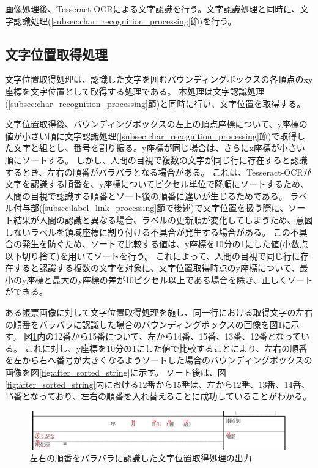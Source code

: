 画像処理後、Tesseract-OCRによる文字認識を行う。文字認識処理と同時に、文字認識処理(\ref{subsec:char_recognition_processing}節)を行う。


\subsection{文字位置取得処理}\label{subsec:char_position_obtainment_processing}
文字位置取得処理は、認識した文字を囲むバウンディングボックスの各頂点のxy座標を文字位置として取得する処理である。
本処理は文字認識処理(\ref{subsec:char_recognition_processing}節)と同時に行い、文字位置を取得する。

文字位置取得後、バウンディングボックスの左上の頂点座標について、y座標の値が小さい順に文字認識処理(\ref{subsec:char_recognition_processing}節)で取得した文字と組とし、番号を割り振る。y座標が同じ場合は、さらにx座標が小さい順にソートする。
しかし、人間の目視で複数の文字が同じ行に存在すると認識するとき、左右の順番がバラバラとなる場合がある。
これは、Tesseract-OCRが文字を認識する順番を、y座標についてピクセル単位で降順にソートするため、人間の目視で認識する順番とソート後の順番に違いが生じるためである。
ラベル付与部(\ref{subsec:label_link_processing}節で後述)で文字位置を扱う際に、ソート結果が人間の認識と異なる場合、ラベルの更新順が変化してしまうため、意図しないラベルを領域座標に割り付ける不具合が発生する場合がある。
この不具合の発生を防ぐため、ソートで比較する値は、y座標を10分の1にした値(小数点以下切り捨て)を用いてソートを行う。
これによって、人間の目視で同じ行に存在すると認識する複数の文字を対象に、文字位置取得時点のy座標について、最小のy座標と最大のy座標の差が10ピクセル以上である場合を除き、正しくソートができる。

ある帳票画像に対して文字位置取得処理を施し、同一行における取得文字の左右の順番をバラバラに認識した場合のバウンディングボックスの画像を図\ref{fig:before_sorted_string}に示す。
図\ref{fig:before_sorted_string}内の12番から15番について、左から14番、15番、13番、12番となっている。
これに対し、y座標を10分の1にした値で比較することにより、左右の順番を左から右へ番号が大きくなるようソートした場合のバウンディングボックスの画像を図\ref{fig:after_sorted_string}に示す。
ソート後は、図\ref{fig:after_sorted_string}内における12番から15番は、左から12番、13番、14番、15番となっており、左右の順番を入れ替えることに成功していることがわかる。

\begin{figure}[t]
    \begin{center}
        \includegraphics[width=15cm]{image/04-implementation/before_sorted_string.png}
        \caption{左右の順番をバラバラに認識した文字位置取得処理の出力}
        \label{fig:before_sorted_string}
    \end{center}
\end{figure}

